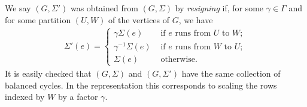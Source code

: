 \documentclass[12pt]{amsart}
\theoremstyle{definition}
\newcommand{\bF}{\mathbb F}
\DeclareMathOperator{\GF}{GF}
\begin{document}
  We say $(G, \Sigma')$ was obtained from $(G, \Sigma)$ by \emph{resigning} if, for some $\gamma \in \Gamma$ and for some partition $(U,W)$ of the vertices of $G$, we have
  \begin{align*}
    \Sigma'(e) = \begin{cases}
        \gamma \Sigma(e) & \text{ if } e \text{ runs from } U \text{ to } W;\\
        \gamma^{-1} \Sigma(e) & \text{ if } e \text{ runs from } W \text{ to } U;\\
        \Sigma(e) & \text{ otherwise}.
    \end{cases}
  \end{align*} 
  It is easily checked that $(G, \Sigma)$ and $(G, \Sigma')$ have the same collection of balanced cycles. In the representation this corresponds to scaling the rows indexed by $W$ by a factor $\gamma$.
   
   
   
\end{document}
